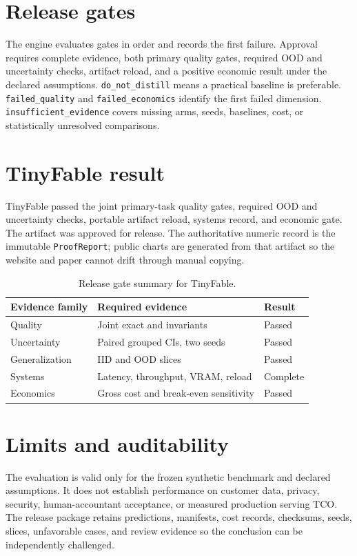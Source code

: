 \documentclass{article}
\begin{document}
\section{Release gates}
The engine evaluates gates in order and records the first failure. Approval requires complete evidence, both primary quality gates, required OOD and uncertainty checks, artifact reload, and a positive economic result under the declared assumptions. \texttt{do\_not\_distill} means a practical baseline is preferable. \texttt{failed\_quality} and \texttt{failed\_economics} identify the first failed dimension. \texttt{insufficient\_evidence} covers missing arms, seeds, baselines, cost, or statistically unresolved comparisons.

\section{TinyFable result}
TinyFable passed the joint primary-task quality gates, required OOD and uncertainty checks, portable artifact reload, systems record, and economic gate. The artifact was approved for release. The authoritative numeric record is the immutable \texttt{ProofReport}; public charts are generated from that artifact so the website and paper cannot drift through manual copying.

\begin{table}[h]
\centering
\begin{tabular}{lll}
\toprule
Evidence family & Required evidence & Result \\
\midrule
Quality & Joint exact and invariants & Passed \\
Uncertainty & Paired grouped CIs, two seeds & Passed \\
Generalization & IID and OOD slices & Passed \\
Systems & Latency, throughput, VRAM, reload & Complete \\
Economics & Gross cost and break-even sensitivity & Passed \\
\bottomrule
\end{tabular}
\caption{Release gate summary for TinyFable.}
\end{table}

\section{Limits and auditability}
The evaluation is valid only for the frozen synthetic benchmark and declared assumptions. It does not establish performance on customer data, privacy, security, human-accountant acceptance, or measured production serving TCO. The release package retains predictions, manifests, cost records, checksums, seeds, slices, unfavorable cases, and review evidence so the conclusion can be independently challenged.
\end{document}

